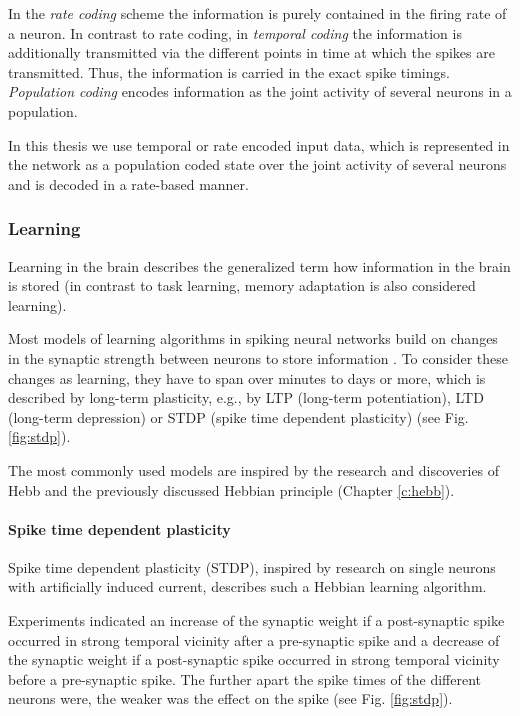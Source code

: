 In the \textit{rate coding} scheme the information is purely contained in the firing rate of a neuron.
In contrast to rate coding, in \textit{temporal coding} the information is additionally transmitted via the different points in time at which the spikes are transmitted. 
Thus, the information is carried in the exact spike timings.
\textit{Population coding} encodes information as the joint activity of several neurons in a population.  

In this thesis we use temporal or rate encoded input data, which is represented in the network as a population coded state over the joint activity of several neurons and is decoded in a rate-based manner. 

\subsubsection{Learning} \label{c:snnlearning}

Learning in the brain describes the generalized term how information in the brain is stored (in contrast to task learning, memory adaptation is also considered learning).

Most models of learning algorithms in spiking neural networks build on changes in the synaptic strength between neurons to store information \cite{gerstner2014neuronal}.
To consider these changes as learning, they have to span over minutes to days or more, which is described by long-term plasticity, e.g., by LTP (long-term potentiation), LTD (long-term depression) or STDP (spike time dependent plasticity) (see Fig. \ref{fig:stdp}).
 
The most commonly used models are inspired by the research and discoveries of Hebb and the previously discussed Hebbian principle (Chapter \ref{c:hebb}).

\paragraph{Spike time dependent plasticity} \label{c:stdp}

Spike time dependent plasticity (STDP), inspired by research on single neurons with artificially induced current, describes such a Hebbian learning algorithm.

Experiments indicated an increase of the synaptic weight if a post-synaptic spike occurred in strong temporal vicinity after a pre-synaptic spike and a decrease of the synaptic weight if a post-synaptic spike occurred in strong temporal vicinity before a pre-synaptic spike.
The further apart the spike times of the different neurons were, the weaker was the effect on the spike (see Fig. \ref{fig:stdp}).


